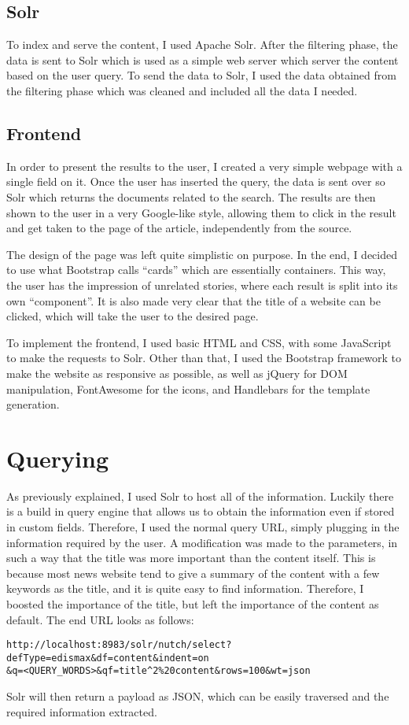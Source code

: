 \documentclass[a4paper]{article}
\begin{document}
\subsection{Solr}
To index and serve the content, I used Apache Solr. After the filtering phase, the data is sent to Solr which is used as a simple web server which server the content based on the user query. To send the data to Solr, I used the data obtained from the filtering phase which was cleaned and included all the data I needed. 

\subsection{Frontend}
In order to present the results to the user, I created a very simple webpage with a single field on it. Once the user has inserted the query, the data is sent over so Solr which returns the documents related to the search. The results are then shown to the user in a very Google-like style, allowing them to click in the result and get taken to the page of the article, independently from the source. 

The design of the page was left quite simplistic on purpose. In the end, I decided to use what Bootstrap calls ``cards'' which are essentially containers. This way, the user has the impression of unrelated stories, where each result is split into its own ``component''. It is also made very clear that the title of a website can be clicked, which will take the user to the desired page.

To implement the frontend, I used basic HTML and CSS, with some JavaScript to make the requests to Solr. Other than that, I used the Bootstrap framework to make the website as responsive as possible, as well as jQuery for DOM manipulation, FontAwesome for the icons, and Handlebars for the template generation.
\section{Querying}
As previously explained, I used Solr to host all of the information. Luckily there is a build in query engine that allows us to obtain the information even if stored in custom fields. Therefore, I used the normal query URL, simply plugging in the information required by the user. A modification was made to the parameters, in such a way that the title was more important than the content itself. This is because most news website tend to give a summary of the content with a few keywords as the title, and it is quite easy to find information. Therefore, I boosted the importance of the title, but left the importance of the content as default. The end URL looks as follows:
\begin{verbatim}
http://localhost:8983/solr/nutch/select?defType=edismax&df=content&indent=on
&q=<QUERY_WORDS>&qf=title^2%20content&rows=100&wt=json	
\end{verbatim}
Solr will then return a payload as JSON, which can be easily traversed and the required information extracted. 
\end{document}
